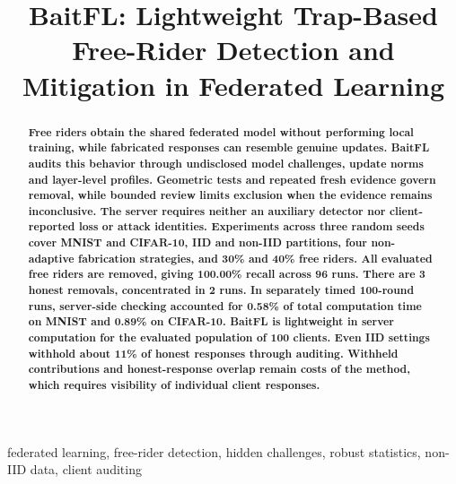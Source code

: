 \documentclass[conference]{IEEEtran}
\title{BaitFL: Lightweight Trap-Based Free-Rider Detection and Mitigation in Federated Learning}
\author{\IEEEauthorblockN{Aashnan Rahman}
\IEEEauthorblockA{Department of Computer Science and Engineering\\
Islamic University of Technology}}
\makeatletter
\renewcommand{\section}{\@startsection{section}{1}{\z@}{1.5ex}{0.7ex}{\normalfont\normalsize\centering\scshape}}
\makeatother
\begin{document}
\maketitle
\raggedbottom
\setlength{\parskip}{0pt plus 2pt minus 0.5pt}
\makeatletter
\def\@textbottom{\vskip\z@ plus 6pt}
\makeatother
\setlength{\abovedisplayskip}{6pt plus 1pt minus 1pt}
\setlength{\belowdisplayskip}{6pt plus 1pt minus 1pt}
\setlength{\abovedisplayshortskip}{3pt plus 1pt minus 1pt}
\setlength{\belowdisplayshortskip}{3pt plus 1pt minus 1pt}
\begingroup\color{black}
\begin{abstract}
\bfseries
Free riders obtain the shared federated model without performing local
training, while fabricated responses can resemble genuine updates.
BaitFL audits this behavior through undisclosed model challenges,
update norms and layer-level profiles. Geometric tests and repeated fresh
evidence govern removal, while bounded review limits exclusion when
the evidence remains inconclusive. The server requires neither an
auxiliary detector nor client-reported loss or attack identities.
Experiments across three random seeds cover MNIST and CIFAR-10, IID and
non-IID partitions, four non-adaptive fabrication strategies, and 30\%
and 40\% free riders. All evaluated free riders are removed, giving
100.00\% recall across 96 runs. There are 3
honest removals, concentrated in 2 runs. In separately
timed 100-round runs, server-side checking accounted for 0.58\% of total
computation time on MNIST and 0.89\% on CIFAR-10.
BaitFL is lightweight in server computation
for the evaluated population of 100 clients. Even IID settings withhold
about 11\% of honest responses through auditing. Withheld contributions
and honest-response overlap remain costs of the method, which requires
visibility of individual client responses.
\end{abstract}
\endgroup
\begin{IEEEkeywords}
federated learning, free-rider detection, hidden challenges, robust statistics,
non-IID data, client auditing
\end{IEEEkeywords}

\section{Introduction}
\end{document}
